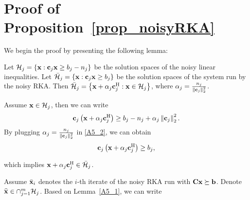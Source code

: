 \documentclass[12pt,draftcls,onecolumn]{IEEEtran}
\begin{document}
\section{Proof of Proposition~\ref{prop_noisyRKA}}
\label{A5}
We begin the proof by presenting the following lemma:
\begin{lemma}
\label{A5_1}
Let $\mathcal{H}_{j}=\left\{\mathbf{x}:\mathbf{c}_{j}\mathbf{x}\geq b_{j}-n_{j}\right\}$ 
be the solution spaces of the noisy linear inequalities. Let $\bar{\mathcal{H}}_{j}=\left\{\mathbf{x}:\mathbf{c}_{j}\mathbf{x}\geq b_{j}\right\}$ be the solution spaces of the system run by the noisy RKA.
Then 
$\bar{\mathcal{H}}_{j}=\left\{\mathbf{x}+\alpha_{j}\mathbf{c}_{j}^{\mathrm{H}}:\mathbf{x}\in\mathcal{H}_{j}\right\}$, where $\alpha_{j}=\frac{n_{j}}{\left\|\mathbf{c}_{j}\right\|_{2}^{2}}$.%
\begin{IEEEproof}
Assume $\mathbf{x}\in\mathcal{H}_{j}$, then we can write
\begin{equation}
\label{A5_2}
\mbc_{j}\left(\mbx+\alpha_{j}\mbc_{j}^{\mathrm{H}}\right)\geq b_{j}-n_j+\alpha_{j}\left\|\mbc_{j}\right\|_{2}^{2}.
\end{equation}
By plugging $\alpha_{j}=\frac{n_{j}}{\left\|\mathbf{c}_{j}\right\|_{2}^{2}}$ in \eqref{A5_2}, we can obtain
\begin{equation}
\label{A5_3}
\mbc_{j}\left(\mbx+\alpha_{j}\mbc_{j}^{\mathrm{H}}\right)\geq b_{j},
\end{equation}

which implies $\mathbf{x}+\alpha_{j}\mathbf{c}_{j}^{\mathrm{H}}\in\bar{\mathcal{H}}_{j}$.
\end{IEEEproof}
\end{lemma}
Assume $\bar{\mathbf{x}}_{i}$ denotes the $i$-th iterate of the noisy RKA run with $\mathbf{C}\mathbf{x}\succeq\mathbf{b}$. Denote $\widehat{\mathbf{x}}\in\cap_{j=1}^{m}\mathcal{H}_j$. Based on Lemma~\ref{A5_1}, we can write
\end{document}
